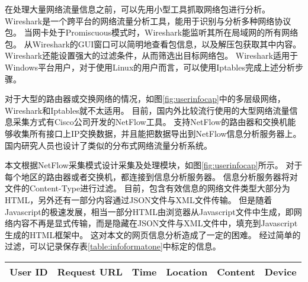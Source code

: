 \begin{center}
\label{fig:userinfocap}
\end{center}

在处理大量网络流量信息之前，可以先用小型工具抓取网络包进行分析。
Wireshark是一个跨平台的网络流量分析工具，能用于识别与分析多种网络协议包。
当网卡处于Promiscuous模式时，Wireshark能监听其所在局域网的所有网络包。
从Wireshark的GUI窗口可以简明地查看包信息，以及解压包获取其中内容。
Wireshark还能设置强大的过滤条件，从而筛选出目标网络包。
Wireshark适用于Windows平台用户，对于使用Linux的用户而言，可以使用Iptables完成上述分析步骤。

对于大型的路由器或交换网络的情况，如图\ref{fig:userinfocap}中的多层级网络，Wireshark和Iptables就不太适用。
目前，国内外比较流行使用的大型网络流量信息采集方式有Cisco公司开发的NetFlow工具。
支持NetFlow的路由器和交换机能够收集所有接口上IP交换数据，并且能把数据导出到NetFlow信息分析服务器上。
国内研究人员也设计了类似的分布式网络流量分析系统\supercite{乔媛媛2014基于,延皓2011基于流量监测的网络用户行为分析,董超2013基于网络流量监测的移动互联网特征研究}。

本文根据NetFlow采集模式设计采集及处理模块，如图\ref{fig:userinfocap}所示。
对于每个地区的路由器或者交换机，都连接到信息分析服务器。
信息分析服务器将对文件的Content-Type进行过滤。
目前，包含有效信息的网络文件类型大部分为HTML，另外还有一部分内容通过JSON文件与XML文件传输。
但是随着Javascript的极速发展，相当一部分HTML由浏览器从Javascript文件中生成，即网络内容不再是显式传输，而是隐藏在JSON文件与XML文件中，填充到Javascript生成的HTML框架中。
这对本文的网页信息分析造成了一定的困难。
经过简单的过滤，可以记录保存表\ref{table:infoformatone}中标定的信息。
\begin{center}
\label{table:infoformatone}
\begin{tabular}{c|c|c|c|c|c}
	\hline
	User ID & Request URL & Time & Location & Content & Device \\
	\hline
\end{tabular}
\end{center}


